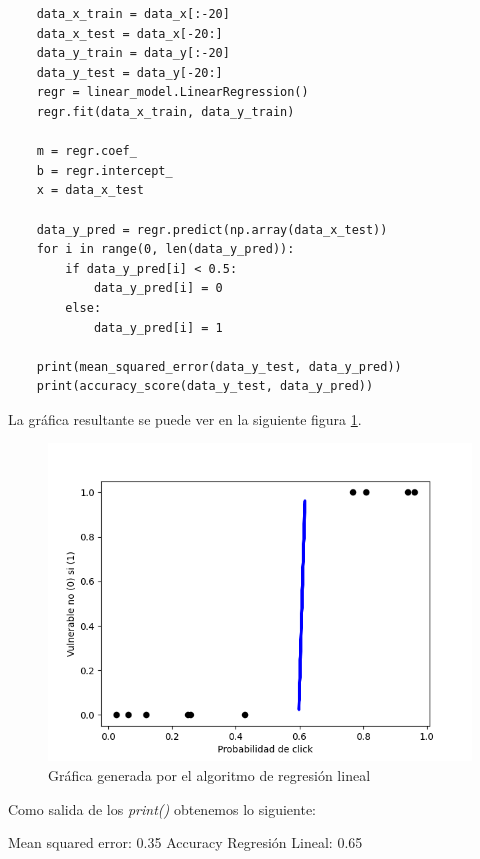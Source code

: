 \documentclass[12pt, a4paper,twoside,titlepage]{article}
\begin{document}
\begin{verbatim}
    data_x_train = data_x[:-20]
    data_x_test = data_x[-20:]
    data_y_train = data_y[:-20]
    data_y_test = data_y[-20:]
    regr = linear_model.LinearRegression()
    regr.fit(data_x_train, data_y_train)

    m = regr.coef_
    b = regr.intercept_
    x = data_x_test

    data_y_pred = regr.predict(np.array(data_x_test))
    for i in range(0, len(data_y_pred)):
        if data_y_pred[i] < 0.5:
            data_y_pred[i] = 0
        else:
            data_y_pred[i] = 1

    print(mean_squared_error(data_y_test, data_y_pred))
    print(accuracy_score(data_y_test, data_y_pred))

\end{verbatim}

La gráfica resultante se puede ver en la siguiente figura \ref{fig:LinearRegresion}.
\newpage
\begin{figure}[H]
    \centering
    \includegraphics[width=1\linewidth]{Figuras/Figure_1.png}
    \caption{Gráfica generada por el algoritmo de regresión lineal}
    \label{fig:LinearRegresion}
\end{figure}


Como salida de los \emph{print()} obtenemos lo siguiente:
\begin{center}
Mean squared error: 0.35
Accuracy Regresión Lineal:  0.65
\end{center}
\end{document}
